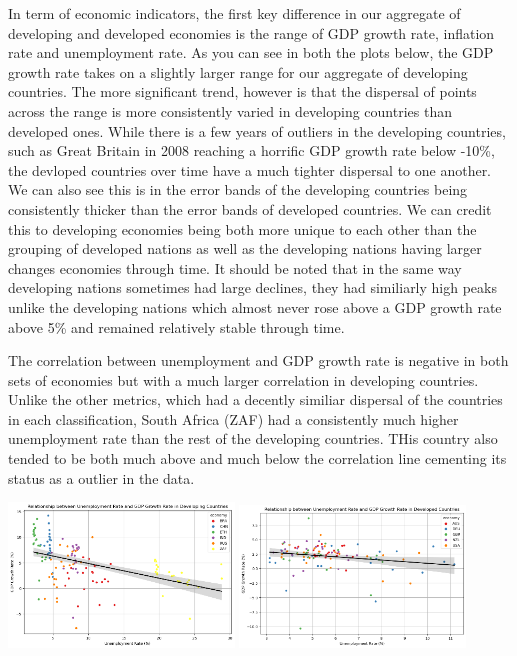 \documentclass[
  letterpaper,
  DIV=11,
  numbers=noendperiod]{scrartcl}
\begin{document}
In term of economic indicators, the first key difference in our
aggregate of developing and developed economies is the range of GDP
growth rate, inflation rate and unemployment rate. As you can see in
both the plots below, the GDP growth rate takes on a slightly larger
range for our aggregate of developing countries. The more significant
trend, however is that the dispersal of points across the range is more
consistently varied in developing countries than developed ones. While
there is a few years of outliers in the developing countries, such as
Great Britain in 2008 reaching a horrific GDP growth rate below -10\%,
the devloped countries over time have a much tighter dispersal to one
another. We can also see this is in the error bands of the developing
countries being consistently thicker than the error bands of developed
countries. We can credit this to developing economies being both more
unique to each other than the grouping of developed nations as well as
the developing nations having larger changes economies through time. It
should be noted that in the same way developing nations sometimes had
large declines, they had similiarly high peaks unlike the developing
nations which almost never rose above a GDP growth rate above 5\% and
remained relatively stable through time.

The correlation between unemployment and GDP growth rate is negative in
both sets of economies but with a much larger correlation in developing
countries. Unlike the other metrics, which had a decently similiar
dispersal of the countries in each classification, South Africa (ZAF)
had a consistently much higher unemployment rate than the rest of the
developing countries. THis country also tended to be both much above and
much below the correlation line cementing its status as a outlier in the
data.

\includegraphics[width=0.45\textwidth,height=\textheight]{figures/Relationship_UnemploymentRate_GDPGrowthRate_DevelopingCountries.png}
\includegraphics[width=0.45\textwidth,height=\textheight]{figures/Relationship_UnemploymentRate_GDPGrowthRate_Developed_Countries.png}
\end{document}
